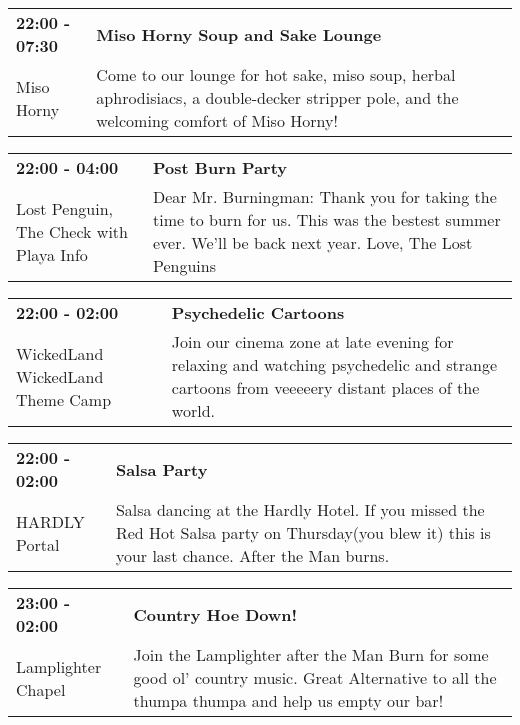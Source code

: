 \begin{tabular}{ p{1in} p{2.2in} }
    \textbf{22:00 - 07:30} & \textbf{Miso Horny Soup and Sake Lounge} \\
    Miso Horny \newline  & Come to our lounge for hot sake, miso soup, herbal aphrodisiacs, a double-decker stripper pole, and the welcoming comfort of Miso Horny! \\
    \hline 
\end{tabular}
    
\begin{tabular}{ p{1in} p{2.2in} }
    \textbf{22:00 - 04:00} & \textbf{Post Burn Party} \\
    Lost Penguin, The \newline Check with Playa Info & Dear Mr. Burningman: Thank you for taking the time to burn for us. This was the bestest summer ever. We'll be back next year.  Love, The Lost Penguins \\
    \hline 
\end{tabular}
    
\begin{tabular}{ p{1in} p{2.2in} }
    \textbf{22:00 - 02:00} & \textbf{Psychedelic Cartoons} \\
    WickedLand \newline WickedLand Theme Camp & Join our cinema zone at late evening for relaxing and watching psychedelic and strange cartoons from veeeeery distant places of the world. \\
    \hline 
\end{tabular}
    
\begin{tabular}{ p{1in} p{2.2in} }
    \textbf{22:00 - 02:00} & \textbf{Salsa Party} \\
    HARDLY \newline 430 Portal & Salsa dancing at the Hardly Hotel.  If you missed the Red Hot Salsa party on Thursday(you blew it) this is your last chance.  After the Man burns. \\
    \hline 
\end{tabular}
    
\begin{tabular}{ p{1in} p{2.2in} }
    \textbf{23:00 - 02:00} & \textbf{Country Hoe Down!} \\
    Lamplighter Chapel \newline  & Join the Lamplighter after the Man Burn for some good ol' country music. Great Alternative to all the thumpa thumpa and help us empty our bar! \\
    \hline 
\end{tabular}
    
